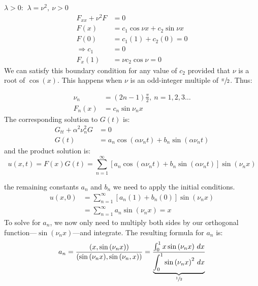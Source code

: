 \vspace{0.25cm}

\noindent\underline{$\lambda > 0$}: $\ \lambda = \nu^2, \ \nu>0$
\begin{align*}
F_{xx} + \nu^2 F &= 0 \\
F(x) &= c_1\cos{\nu x} + c_2 \sin{\nu x} \\
F(0) &= c_1(1) + c_2(0) = 0 \\
\Rightarrow c_1 &= 0 \\
F_{x}(1) &= \nu c_2 \cos{\nu} = 0
\end{align*}
We can satisfy this boundary condition for any value of $c_2$ provided that $\nu$ is a root of $\cos(x)$.  This happens when $\nu$ is an odd-integer multiple of $\sfrac{\pi}{2}$.  Thus:

\begin{align*}
\nu_n &= (2n-1)\frac{\pi}{2}, \ n=1,2,3\dots \\
F_n(x) &= c_n \sin{\nu_n x}
\end{align*} 
The corresponding solution to $G(t)$ is:
\begin{align*}
G_{tt} + \alpha^2 \nu_n^2 G &= 0 \\
G(t) &= a_n \cos{(\alpha \nu_n t)}+b_n\sin{(\alpha \nu_n t)}
\end{align*}
and the product solution is:
\begin{equation*}
u(x,t) = F(x)G(t) = \sum\limits_{n=1}^{\infty} \left[a_n \cos{(\alpha \nu_n t)}+b_n\sin{(\alpha \nu_n t)} \right]\sin{(\nu_n x)}
\end{equation*}

 the remaining constants $a_n$ and $b_n$ we need to apply the initial conditions.
\begin{align*}
u(x,0) &= \sum\limits_{n=1}^{\infty}\left[a_n(1) + b_n(0) \right]\sin{(\nu_n x)} \\
&=\sum\limits_{n=1}^{\infty} a_n \sin{(\nu_n x)} = x
\end{align*}
To solve for $a_n$, we now only need to multiply both sides by our orthogonal function---$\sin{(\nu_n x)}$---and integrate.  The resulting formula for $a_n$ is:
\begin{equation*}
a_n = \frac{(x,\sin{(\nu_n x)})}{(\sin{(\nu_nx)},\sin{(\nu_n,x)})} = \frac{\int_{0}^{1}x \sin{(\nu_n x)} \ dx}{\underbrace{\int_0^1 \sin{(\nu_n x)}^2 \ dx}_{\sfrac{1}{2}}}
\end{equation*}

